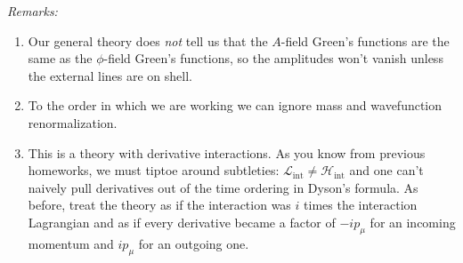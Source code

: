 \documentclass[12pt]{article}
\begin{document}
\begin{enumerate}
\textit{Remarks:}
\begin{enumerate}
\item Our general theory does \textit{not} tell us that the $A$-field Green's functions are the same as the $\phi$-field Green's functions, so the amplitudes won't vanish unless the external lines are on shell.
\item To the order in which we are working we can ignore mass and wavefunction renormalization. 
\item This is a theory with derivative interactions. As you know from previous homeworks, we must tiptoe around subtleties: $\mathcal L_\text{int} \neq \mathcal H_\text{int}$ and one can't naively pull derivatives out of the time ordering in Dyson's formula. As before, treat the theory as if the interaction was $i$ times the interaction Lagrangian and as if every derivative became a factor of $-ip_\mu$ for an incoming momentum and $ip_\mu$ for an outgoing one.
\end{enumerate}



%
\end{enumerate}
 
\end{document}
